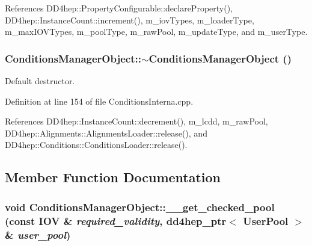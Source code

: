 References DD4hep::PropertyConfigurable::declareProperty(), DD4hep::InstanceCount::increment(), m\_\-iovTypes, m\_\-loaderType, m\_\-maxIOVTypes, m\_\-poolType, m\_\-rawPool, m\_\-updateType, and m\_\-userType.\hypertarget{class_d_d4hep_1_1_conditions_1_1_conditions_manager_object_a78747f9367ce2e43b3d0ee4214eb9ab3}{
\subsubsection[{$\sim$ConditionsManagerObject}]{\setlength{\rightskip}{0pt plus 5cm}ConditionsManagerObject::$\sim$ConditionsManagerObject ()}}
\label{class_d_d4hep_1_1_conditions_1_1_conditions_manager_object_a78747f9367ce2e43b3d0ee4214eb9ab3}


Default destructor. 

Definition at line 154 of file ConditionsInterna.cpp.

References DD4hep::InstanceCount::decrement(), m\_\-lcdd, m\_\-rawPool, DD4hep::Alignments::AlignmentsLoader::release(), and DD4hep::Conditions::ConditionsLoader::release().

\subsection{Member Function Documentation}
\hypertarget{class_d_d4hep_1_1_conditions_1_1_conditions_manager_object_a4e7c5a6f766e182c7fcdcf766c28f9a0}{
\subsubsection[{\_\-\_\-get\_\-checked\_\-pool}]{\setlength{\rightskip}{0pt plus 5cm}void ConditionsManagerObject::\_\-\_\-get\_\-checked\_\-pool (const {\bf IOV} \& {\em required\_\-validity}, \/  {\bf dd4hep\_\-ptr}$<$ {\bf UserPool} $>$ \& {\em user\_\-pool})}}
\label{class_d_d4hep_1_1_conditions_1_1_conditions_manager_object_a4e7c5a6f766e182c7fcdcf766c28f9a0}


